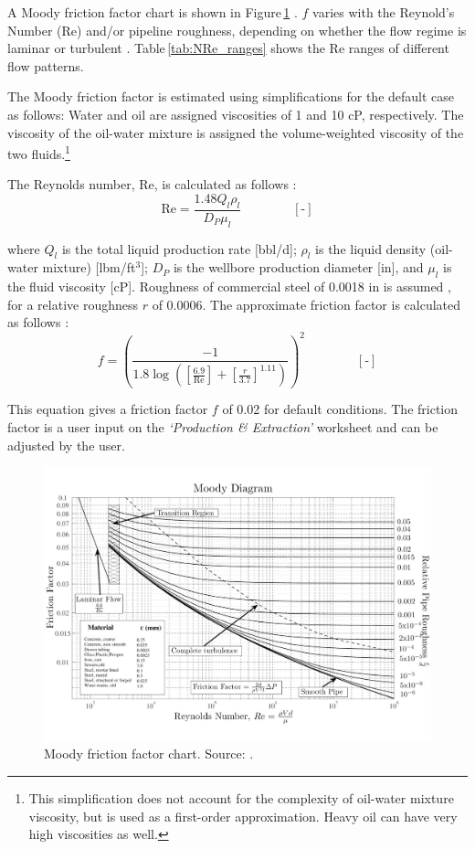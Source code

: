 \documentclass[11pt]{report}
\newcommand{\sheet}[1]{\textit{`{#1}'}}
\newcommand{\eqnunit}[1]{\quad\quad \scriptstyle{\left[\text{#1}\right]}}
\begin{document}
A Moody friction factor chart is shown in Figure\,\ref{fig:Moody_chart} \cite{Moody2008}. $f$ varies with the Reynold's Number (Re) and/or pipeline roughness, depending on whether the flow regime is laminar or turbulent \cite[p. 481]{Mcallister2009}. Table\,\ref{tab:NRe_ranges} shows the Re ranges of different flow patterns. 

The Moody friction factor is estimated using simplifications for the default case as follows: Water and oil are assigned viscosities of 1 and 10 cP, respectively. The viscosity of the oil-water mixture is assigned the volume-weighted viscosity of the two fluids.\footnote{This simplification does not account for the complexity of oil-water mixture viscosity, but is used as a first-order approximation. Heavy oil can have very high viscosities as well.} 

The Reynolds number, Re, is calculated as follows \cite[p. 46]{Guo2007}:
\begin{equation}\label{eq:Nre}
\textrm{Re} = \frac{1.48 Q_l \rho_l}{D_P \mu_l} \quad\quad\eqnunit{-}
\end{equation} 

where $Q_l$ is the total liquid production rate [bbl/d]; $\rho_l$ is the liquid density (oil-water mixture) [lbm/ft$^3$]; $D_P$ is the wellbore production diameter [in], and $\mu_l$ is the fluid viscosity [cP]. Roughness of commercial steel of 0.0018 in is assumed \cite{Cengel2005}, for a relative roughness $r$ of 0.0006. The approximate friction factor is calculated as follows \cite[p. 625]{Cengel2005}:
\begin{equation}\label{eq:fric_factor}
f = \left( \frac{-1}{1.8\log\left(\left[ \frac{6.9}{\textrm{Re}}\right] + \left[ \frac{r}{3.7} \right]^{1.11} \right) } \right)^{2} \quad\quad\eqnunit{-}
\end{equation} 

This equation gives a friction factor $f$ of 0.02 for default conditions. The friction factor is a user input on the \sheet{Production \& Extraction} worksheet and can be adjusted by the user. 

\begin{figure}
\includegraphics[width=0.95\columnwidth]{images/Moody_chart.pdf}
\caption{Moody friction factor chart. Source: \cite{Moody2008}.}
\label{fig:Moody_chart}
\end{figure}
\end{document}
